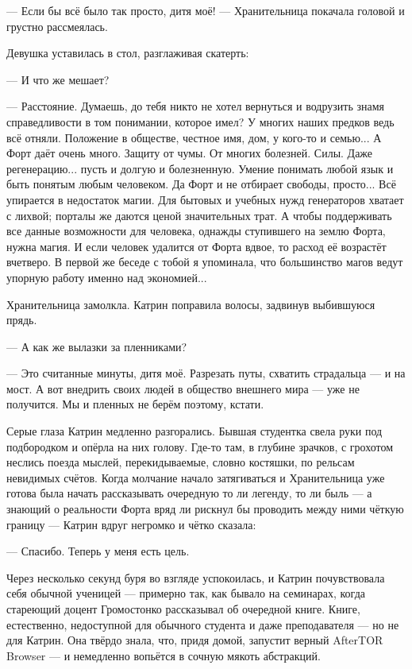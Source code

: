
--- Если бы всё было так просто, дитя моё! --- Хранительница покачала головой и грустно рассмеялась.

Девушка уставилась в стол, разглаживая скатерть:

--- И что же мешает?

--- Расстояние. Думаешь, до тебя никто не хотел вернуться и водрузить знамя справедливости в том понимании, которое имел?
У многих наших предков ведь всё отняли. Положение в обществе, честное имя, дом, у кого-то и семью...
А Форт даёт очень много. Защиту от чумы. От многих болезней. Силы. Даже регенерацию... пусть и долгую и болезненную.
Умение понимать любой язык и быть понятым любым человеком. Да Форт и не отбирает свободы, просто...
Всё упирается в недостаток магии. Для бытовых и учебных нужд генераторов хватает с лихвой;
порталы же даются ценой значительных трат. А чтобы поддерживать все данные возможности для человека,
однажды ступившего на землю Форта, нужна магия. И если человек удалится от Форта вдвое, то расход её возрастёт вчетверо.
В первой же беседе с тобой я упоминала, что большинство магов ведут упорную работу именно над экономией...

Хранительница замолкла. Катрин поправила волосы, задвинув выбившуюся прядь.

--- А как же вылазки за пленниками?

--- Это считанные минуты, дитя моё. Разрезать путы, схватить страдальца --- и на мост.
А вот внедрить своих людей в общество внешнего мира --- уже не получится. Мы и пленных не берём поэтому, кстати.

Серые глаза Катрин медленно разгорались. Бывшая студентка свела руки под подбородком и опёрла на них голову.
Где-то там, в глубине зрачков, с грохотом неслись поезда мыслей, перекидываемые, словно костяшки, по рельсам невидимых счётов.
Когда молчание начало затягиваться и Хранительница уже готова была начать рассказывать очередную то ли легенду,
то ли быль --- а знающий о реальности Форта вряд ли рискнул бы проводить между ними чёткую границу ---
Катрин вдруг негромко и чётко сказала:

--- Спасибо. Теперь у меня есть цель.

\emptypar

Через несколько секунд буря во взгляде успокоилась, и Катрин почувствовала себя обычной ученицей ---
примерно так, как бывало на семинарах, когда стареющий доцент Громостонко рассказывал об очередной книге.
Книге, естественно, недоступной для обычного студента и даже преподавателя --- но не для Катрин.
Она твёрдо знала, что, придя домой, запустит верный AfterTOR Browser --- и немедленно вопьётся в сочную мякоть абстракций.


